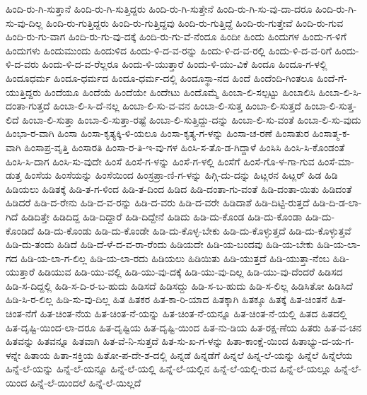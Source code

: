 {ಹಿಂದಿ-ರು-ಗಿ-ಸುತ್ತಾನೆ
ಹಿಂದಿ-ರು-ಗಿ-ಸುತ್ತಿದ್ದರು
ಹಿಂದಿ-ರು-ಗಿ-ಸುತ್ತೇನೆ
ಹಿಂದಿ-ರು-ಗಿ-ಸು-ವು-ದಾ-ದರೂ
ಹಿಂದಿ-ರು-ಗಿ-ಸು-ವು-ದಿಲ್ಲ
ಹಿಂದಿ-ರು-ಗುತ್ತಿದ್ದರು
ಹಿಂದಿ-ರು-ಗುತ್ತಿದ್ದವು
ಹಿಂದಿ-ರು-ಗುತ್ತಿದ್ದೆ
ಹಿಂದಿ-ರು-ಗುತ್ತೇವೆ
ಹಿಂದಿ-ರು-ಗುವ
ಹಿಂದಿ-ರು-ಗು-ವಾಗ
ಹಿಂದಿ-ರು-ಗು-ವು-ದಕ್ಕೆ
ಹಿಂದಿ-ರು-ಗು-ವೆ-ನೆಂದೂ
ಹಿಂದೀ
ಹಿಂದು
ಹಿಂದುಗಳ
ಹಿಂದು-ಗ-ಳಿಗೆ
ಹಿಂದುಗಳು
ಹಿಂದುಮುಂದು
ಹಿಂದುಳಿದ
ಹಿಂದು-ಳಿ-ದ-ವ-ರನ್ನು
ಹಿಂದು-ಳಿ-ದ-ವ-ರಲ್ಲಿ
ಹಿಂದು-ಳಿ-ದ-ವ-ರಿಗೆ
ಹಿಂದು-ಳಿ-ದ-ವರು
ಹಿಂದು-ಳಿ-ದ-ವ-ರೆಲ್ಲರೂ
ಹಿಂದು-ಳಿ-ಯುತ್ತಾರೆ
ಹಿಂದು-ಳಿ-ಯು-ವಿಕೆ
ಹಿಂದೂ
ಹಿಂದೂ-ಗ-ಳಲ್ಲಿ
ಹಿಂದೂಧರ್ಮ
ಹಿಂದೂ-ಧರ್ಮದ
ಹಿಂದೂ-ಧರ್ಮ-ದಲ್ಲಿ
ಹಿಂದೂಸ್ಥಾ-ನದ
ಹಿಂದೆ
ಹಿಂದೆಂದಿ-ಗಿಂತಲೂ
ಹಿಂದೆ-ಗೆ-ಯುತ್ತಿದ್ದರು
ಹಿಂದೆಯೂ
ಹಿಂದೆಯೆ
ಹಿಂದೆಯೇ
ಹಿಂದೇಟು
ಹಿಂದೊಮ್ಮೆ
ಹಿಂಬಾ-ಲಿ-ಸಲ್ಪಟ್ಟು
ಹಿಂಬಾಲಿಸಿ
ಹಿಂಬಾ-ಲಿ-ಸಿ-ದಂತಾ-ಗುತ್ತದೆ
ಹಿಂಬಾ-ಲಿ-ಸಿ-ದೆ-ನಲ್ಲ
ಹಿಂಬಾ-ಲಿ-ಸು-ವ-ವನ
ಹಿಂಬಾ-ಲಿ-ಸುತ್ತ
ಹಿಂಬಾ-ಲಿ-ಸುತ್ತದೆ
ಹಿಂಬಾ-ಲಿ-ಸುತ್ತ-ಲಿದೆ
ಹಿಂಬಾ-ಲಿ-ಸುತ್ತಾ
ಹಿಂಬಾ-ಲಿ-ಸುತ್ತಾ-ರಷ್ಟೆ
ಹಿಂಬಾ-ಲಿ-ಸುತ್ತಿದ್ದು-ದನ್ನು
ಹಿಂಬಾ-ಲಿ-ಸು-ವಂತೆ
ಹಿಂಬಾ-ಲಿ-ಸು-ವುದು
ಹಿಂಭಾ-ರ-ವಾಗಿ
ಹಿಂಸಾ
ಹಿಂಸಾ-ಕೃತ್ಯಕ್ಕಿ-ಳಿ-ಯಲೂ
ಹಿಂಸಾ-ಕೃತ್ಯ-ಗ-ಳನ್ನು
ಹಿಂಸಾ-ಚ-ರಣೆ
ಹಿಂಸಾತುರ
ಹಿಂಸಾತ್ಮ-ಕ-ವಾಗಿ
ಹಿಂಸಾಪ್ರ-ವೃತ್ತಿ
ಹಿಂಸಾರತಿ
ಹಿಂಸಾ-ರ-ತಿ-ಇ-ವು-ಗಳ
ಹಿಂಸಿ-ಸ-ತೊ-ಡ-ಗಿದ್ದಾಳೆ
ಹಿಂಸಿಸಿ
ಹಿಂಸಿ-ಸಿ-ಕೊಂಡಂತೆ
ಹಿಂಸಿ-ಸಿ-ದಾಗ
ಹಿಂಸಿ-ಸು-ವುದೇ
ಹಿಂಸೆ
ಹಿಂಸೆ-ಗ-ಳನ್ನು
ಹಿಂಸೆ-ಗ-ಳಲ್ಲಿ
ಹಿಂಸೆಗೆ
ಹಿಂಸೆ-ಗೊ-ಳ-ಗಾ-ಗುವ
ಹಿಂಸೆ-ಮಾ-ಡುತ್ತ
ಹಿಂಸೆಯ
ಹಿಂಸೆಯನ್ನು
ಹಿಂಸೆಯಿಂದ
ಹಿಂಸ್ರಪ್ರಾ-ಣಿ-ಗ-ಳನ್ನು
ಹಿಗ್ಗಿ-ದು-ದನ್ನು
ಹಿಟ್ಲರನ
ಹಿಟ್ಲರ್
ಹಿಡ
ಹಿಡಿ
ಹಿಡಿಯಲು
ಹಿಡಿತಕ್ಕೆ
ಹಿಡಿ-ತ-ಗ-ಳಿಂದ
ಹಿಡಿ-ತ-ದಿಂದ
ಹಿಡಿದ
ಹಿಡಿ-ದಂತಾ-ಗು-ವಂತೆ
ಹಿಡಿ-ದಂತಾ-ಯಿತು
ಹಿಡಿದಂತೆ
ಹಿಡಿದರೆ
ಹಿಡಿ-ದ-ರೇನು
ಹಿಡಿ-ದ-ವ-ರನ್ನು
ಹಿಡಿ-ದ-ವರು
ಹಿಡಿ-ದ-ವರೇ
ಹಿಡಿದಾಶೆ
ಹಿಡಿ-ದಿಟ್ಟಿ-ರುತ್ತದೆ
ಹಿಡಿ-ದಿ-ಡ-ಲಾ-ಗಿದೆ
ಹಿಡಿದಿತ್ತೇ
ಹಿಡಿದಿದ್ದ
ಹಿಡಿ-ದಿದ್ದಾರೆ
ಹಿಡಿ-ದಿದ್ದೇನೆ
ಹಿಡಿದು
ಹಿಡಿ-ದು-ಕೊಂಡ
ಹಿಡಿ-ದು-ಕೊಂಡಾ
ಹಿಡಿ-ದು-ಕೊಂಡಿದೆ
ಹಿಡಿ-ದು-ಕೊಂಡು
ಹಿಡಿ-ದು-ಕೊಂಡೇ
ಹಿಡಿ-ದು-ಕೊಳ್ಳ-ಬೇಕು
ಹಿಡಿ-ದು-ಕೊಳ್ಳುತ್ತದೆ
ಹಿಡಿ-ದು-ಕೊಳ್ಳುತ್ತವೆ
ಹಿಡಿ-ದು-ತಂದು
ಹಿಡಿದೆ
ಹಿಡಿ-ದೆ-ಳೆ-ದ-ವ-ರಾ-ರೆಂದು
ಹಿಡಿಯದೇ
ಹಿಡಿ-ಯ-ಬಂದವು
ಹಿಡಿ-ಯ-ಬೇಕು
ಹಿಡಿ-ಯ-ಲಾ-ಗದ
ಹಿಡಿ-ಯ-ಲಾ-ಗ-ಲಿಲ್ಲ
ಹಿಡಿ-ಯ-ಲಾ-ರದು
ಹಿಡಿಯಲು
ಹಿಡಿಯಿತು
ಹಿಡಿ-ಯುತ್ತದೆ
ಹಿಡಿ-ಯುತ್ತಾ-ನೆಂಬ
ಹಿಡಿ-ಯುತ್ತಾರೆ
ಹಿಡಿಯುವ
ಹಿಡಿ-ಯು-ವಲ್ಲಿ
ಹಿಡಿ-ಯು-ವು-ದಕ್ಕೆ
ಹಿಡಿ-ಯು-ವು-ದಿಲ್ಲ
ಹಿಡಿ-ಯು-ವು-ದೆಂದರೆ
ಹಿಡಿಸದ
ಹಿಡಿ-ಸ-ದಿದ್ದಲ್ಲಿ
ಹಿಡಿ-ಸ-ದಿ-ರ-ಬ-ಹುದು
ಹಿಡಿಸದೆ
ಹಿಡಿಸದ್ದು
ಹಿಡಿ-ಸ-ಬ-ಹುದು
ಹಿಡಿ-ಸ-ಲಿಲ್ಲ
ಹಿಡಿಸಿತೋ
ಹಿಡಿಸಿದೆ
ಹಿಡಿ-ಸಿ-ರ-ಲಿಲ್ಲ
ಹಿಡಿ-ಸು-ವು-ದಿಲ್ಲ
ಹಿತ
ಹಿತಕರ
ಹಿತ-ಕಾ-ರಿ-ಯಾದ
ಹಿತಕ್ಕಾಗಿ
ಹಿತಕ್ಕೂ
ಹಿತಕ್ಕೆ
ಹಿತ-ಚಿಂತನೆ
ಹಿತ-ಚಿಂತ-ನೆಗೆ
ಹಿತ-ಚಿಂತ-ನೆಯ
ಹಿತ-ಚಿಂತ-ನೆ-ಯನ್ನು
ಹಿತ-ಚಿಂತ-ನೆ-ಯನ್ನೂ
ಹಿತ-ಚಿಂತ-ನೆ-ಯಲ್ಲಿ
ಹಿತದ
ಹಿತದಲ್ಲಿ
ಹಿತ-ದೃಷ್ಟಿ-ಯಿಂದ-ಲಾ-ದರೂ
ಹಿತ-ದೃಷ್ಟಿಯ
ಹಿತ-ದೃಷ್ಟಿ-ಯಿಂದ
ಹಿತ-ನು-ಡಿಯ
ಹಿತ-ರಕ್ಷ-ಣೆಯ
ಹಿತರು
ಹಿತ-ವ-ಚನ
ಹಿತವನ್ನು
ಹಿತವನ್ನೂ
ಹಿತವಾಗಿ
ಹಿತ-ವೆ-ನಿ-ಸುತ್ತದೆ
ಹಿತ-ಸು-ಖ-ಗ-ಳನ್ನು
ಹಿತಾ-ಕಾಂಕ್ಷೆ-ಯಿಂದ
ಹಿತಾಭ್ಯು-ದ-ಯ-ಗ-ಳನ್ನೇ
ಹಿತಾಯ
ಹಿತಾ-ಸಕ್ತಿಯ
ಹಿತೋ-ಪ-ದೇ-ಶ-ದಲ್ಲಿ
ಹಿನ್ನಡೆ
ಹಿನ್ನಡೆಗೆ
ಹಿನ್ನಲೆ
ಹಿನ್ನ-ಲೆ-ಯನ್ನು
ಹಿನ್ನೆಲೆ
ಹಿನ್ನೆಲೆಯ
ಹಿನ್ನೆ-ಲೆ-ಯನ್ನು
ಹಿನ್ನೆ-ಲೆ-ಯನ್ನೂ
ಹಿನ್ನೆ-ಲೆ-ಯಲ್ಲಿ
ಹಿನ್ನೆ-ಲೆ-ಯಲ್ಲಿನ
ಹಿನ್ನೆ-ಲೆ-ಯಲ್ಲಿ-ರುವ
ಹಿನ್ನೆ-ಲೆ-ಯಲ್ಲೂ
ಹಿನ್ನೆ-ಲೆ-ಯಿಂದ
ಹಿನ್ನೆ-ಲೆ-ಯಿಂದಲೆ
ಹಿನ್ನೆ-ಲೆ-ಯಿಲ್ಲದೆ
}
